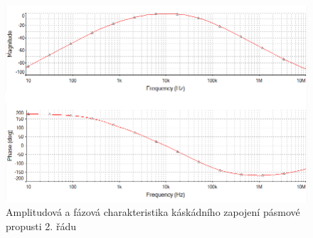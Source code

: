 \documentclass[twoside]{article}
\begin{document}
\begin{figure}[H]
\centering
\includegraphics[scale=0.75]{lrcbandpassampl.png}
\caption{Amplitudová a fázová charakteristika káskádního zapojení pásmové propusti 2. řádu}
\end{figure}
\newpage
\end{document}
